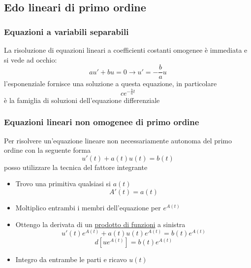 \subsection{Edo lineari di primo ordine}
\subsubsection*{Equazioni a variabili separabili}
\label{edol1}
La risoluzione di equazioni lineari a coefficienti costanti omogenee è immediata e si vede ad occhio:
\[
	au' + bu = 0 \rightarrow u' = -\frac{b}{a}u
\]
l'esponenziale fornisce una soluzione a questa equazione, in particolare
\[
	ce ^{-\frac{b}{a}t}
\]
è la famiglia di soluzioni dell'equazione differenziale

\subsubsection*{Equazioni lineari non omogenee di primo ordine}
Per risolvere un'equazione lineare non necessariamente autonoma del primo ordine con la seguente forma
\[
	u'\left( t \right) + a\left( t \right) u\left( t \right) = b\left( t \right)
\]
posso utilizzare la tecnica del fattore integrante
\begin{itemize}
	\item Trovo una primitiva qualsiasi si $ a\left( t \right)  $
	      \[
		      A'\left( t \right)=a\left( t \right)
	      \]
	\item Moltiplico entrambi i membri dell'equazione per $ e^{A\left( t \right) } $
	\item Ottengo la derivata di un \underline{prodotto di funzioni} a sinistra
	      \[
		      u'\left( t \right)e^{A\left( t \right) } + a\left( t \right) u\left( t \right) e^{A\left( t \right) } = b\left( t \right) e^{A\left( t \right) }
	      \]
	      \[
		      d \left[ ue^{A\left( t \right) } \right] = b\left( t \right) e^{A\left( t \right) }
	      \]
	\item Integro da entrambe le parti e ricavo $ u\left( t \right)  $
\end{itemize}


